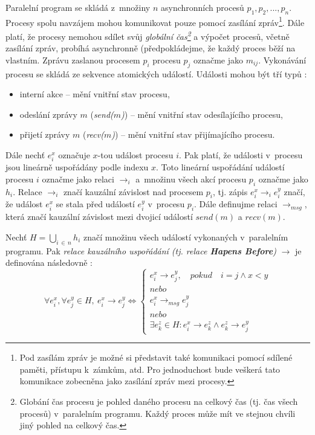 
Paralelní program se skládá z~množiny $n$ asynchronních procesů ${p_1, p_2, ..., p_n}$. Procesy spolu navzájem mohou komunikovat pouze pomocí zasílání zpráv\footnote{Pod zasílám zpráv je možné si představit také komunikaci pomocí sdílené paměti, přístupu k~zámkům, atd. Pro jednoduchost bude veškerá tato komunikace zobecněna jako zasílání zpráv mezi procesy.}. Dále platí, že procesy nemohou sdílet svůj \textit{globální čas\footnote{Globání čas procesu je pohled daného procesu na celkový čas (tj. čas všech procesů) v~paralelním programu. Každý proces může mít ve stejnou chvíli jiný pohled na celkový čas.}} a výpočet procesů, včetně zasílání zpráv, probíhá asynchronně (předpokládejme, že každý proces běží na vlastním. Zprávu zaslanou procesem $p_i$ procesu $p_j$ označme jako $m_{ij}$. Vykonávání procesu se skládá ze sekvence atomických událostí. Události mohou být tří typů \cite{cite:PDI}:

\begin{itemize}
\item interní akce -- mění vnitřní stav procesu,
\item odeslání zprávy $m$ (\textit{send($m$)}) -- mění vnitřní stav odesílajícího procesu,
\item přijetí zprávy $m$ (\textit{recv($m$)}) -- mění vnitřní stav přijímajícího procesu.
\end{itemize}

Dále nechť $e^x_i$ označuje $x$-tou událost procesu $i$. Pak platí, že události v~procesu jsou lineárně uspořádány podle indexu $x$. Toto lineární uspořádání událostí procesu $i$ označme jako relaci $\rightarrow_i$ a~množinu všech akcí procesu $p_i$ označme jako $h_i$. Relace $\rightarrow_i$ značí kauzální závislost nad procesem $p_i$, tj. zápis $e^x_i \rightarrow_i e^y_i$ značí, že událost $e^x_i$ se stala před událostí $e^y_i$ v~procesu $p_i$. Dále definujme relaci $\rightarrow_{msg}$, která značí kauzální závislost mezi dvojicí událostí $send(m)$ a $recv(m)$.

Nechť $H=\bigcup\limits_{i \, \in\, n} h_i$ značí množinu všech událostí vykonaných v~paralelním programu. Pak \textit{relace kauzálního uspořádání (tj. relace \textbf{Hapens Before})} $\rightarrow$ je definována následovně \cite{cite:PDI}:
$$\forall e_i^x, \forall e_j^y \in H,\: e_i^x \rightarrow e_j^y \Leftrightarrow 
\left\{
	\begin{array}{ll}
       e_i^x \rightarrow e_j^y,\quad pokud \quad i=j \wedge x < y \\
       nebo\\
       e_i^x \rightarrow_{msg} e_j^y \\
       nebo\\
       \exists e_k^z \in H:  e_i^x \rightarrow e_k^z \wedge  e_k^z \rightarrow e_j^y
    \end{array}
\right.$$

